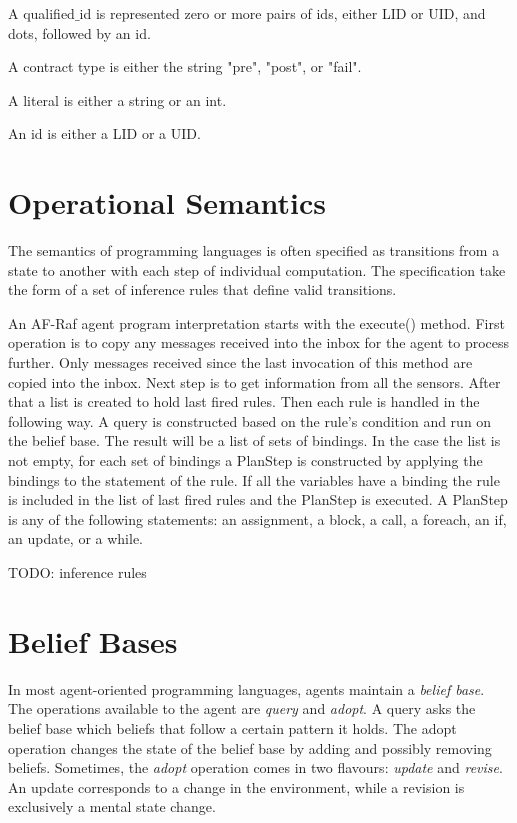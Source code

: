 \documentclass[a4paper,12pt,oneside,fleqn]{book} %
\theoremstyle{plain}
\theoremstyle{definition}
\theoremstyle{remark}
\begin{document}
A qualified$\_$id is represented zero or more pairs of ids, either LID or
UID, and dots, followed by an id.

A contract type is either the string "pre", "post", or "fail".

A literal is either a string or an int.

An id is either a LID or a UID.





\section{Operational Semantics} %

The semantics of programming languages is often specified as transitions
from a state to another with each step of individual computation. The
specification take the form of a set of inference rules that define valid
transitions.

An AF-Raf agent program interpretation starts with the execute() method.
First operation is to copy any messages received into the inbox for the
agent to process further. Only messages received since the last invocation
of this method are copied into the inbox. Next step is to get information
from all the sensors. After that a list is created to hold last fired
rules. Then each rule is handled in the following way. A query is
constructed based on the rule's condition and run on the belief base. The
result will be a list of sets of bindings. In the case the list is not
empty, for each set of bindings a PlanStep is constructed by applying the
bindings to the statement of the rule. If all the variables have a binding
the rule is included in the list of last fired rules and the PlanStep is
executed. A PlanStep is any of the following statements: an assignment, a block,
a call, a foreach, an if, an update, or a while.

TODO: inference rules


\section{Belief Bases} %

In most agent-oriented programming languages, agents maintain a
\emph{belief base}.  The operations available to the agent are
\textit{query} and \textit{adopt}.  A query asks the belief base which
beliefs that follow a certain pattern it holds.  The adopt operation
changes the state of the belief base by adding and possibly removing
beliefs.  Sometimes, the {\it adopt\/} operation comes in two flavours:
{\it update\/} and {\it revise}.  An update corresponds to a change in the
environment, while a revision is exclusively a mental state change.
\end{document}

